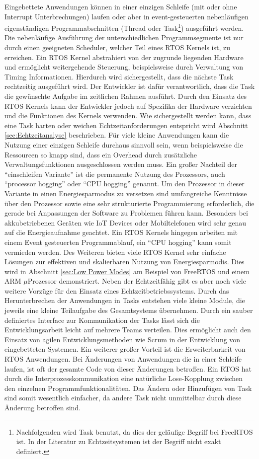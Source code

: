 Eingebettete Anwendungen können in einer einzigen Schleife (mit oder ohne Interrupt Unterbrechungen) laufen oder aber in event-gesteuerten ne\-ben\-läuf\-igen ei\-gen\-stän\-dig\-en Programmabschnitten (Thre\-ad oder Task\footnote{Nachfolgenden wird Task benutzt, da dies der geläufige Begriff bei FreeRTOS ist. In der Literatur zu Echtzeitsystemen ist der Begriff nicht exakt definiert.}) ausgeführt werden. Die nebenläufige Aus\-füh\-rung der unterschiedlichen Programmsegmente ist nur durch einen geeigneten Scheduler, welcher Teil eines RTOS Kernels ist, zu erreichen. Ein RTOS Kernel abstrahiert von der zugrunde liegenden Hardware und ermöglicht weitergehende Steuerung, beispielsweise durch Verwaltung von Timing Informationen. Hierdurch wird sichergestellt, dass die nächste Task rechtzeitig ausgeführt wird. Der Entwickler ist dafür verantwortlich, dass die Task die gewünschte Aufgabe im zeitlichen Rahmen ausführt. Durch den Einsatz des RTOS Kernels kann der Entwickler jedoch auf Spezifika der Hardware verzichten und die Funktionen des Kernels verwenden. Wie sichergestellt werden kann, dass eine Task  harten oder weichen Echtzeitanforderungen entspricht wird Abschnitt \ref{sec:Echtzeitanalyse} beschrieben. Für viele kleine Anwendungen kann die Nutzung einer einzigen Schleife durchaus sinnvoll sein, wenn beispielsweise die Ressourcen so knapp sind, dass ein Overhead durch zusätzliche Verwaltungsfunktionen ausgeschlossen werden muss. Ein großer Nachteil der "`einschleifen Variante"' ist die permanente Nutzung des Prozessors, auch "`processor hogging"' oder "`CPU hogging"' genannt. Um den Prozessor in dieser Variante in einen Energiesparmodus zu versetzen sind umfangreiche Kenntnisse über den Prozessor sowie eine sehr strukturierte Programmierung erforderlich, die gerade bei Anpassungen der Software zu Problemen führen kann. Besonders bei akkubetriebenen Geräten wie IoT Devices oder Mobiltelefonen wird sehr genau auf die Energieaufnahme geachtet. Ein RTOS Kernels hingegen arbeiten mit einem Event gesteuerten Programmablauf, ein "`CPU hogging"' kann somit vermieden werden. Des Weiteren bieten viele RTOS Kernel sehr einfache Lösungen zur effektiven und skalierbaren Nutzung von Energiesparmodis. Dies wird in Abschnitt \ref{sec:Low Power Modes} am Beispiel von FreeRTOS und einem ARM $\mu$Prozessor demonstriert. Neben der Echtzeitfähig gibt es aber noch viele weitere Vorzüge für den Einsatz eines Echtzeitbetriebssystems.  
Durch das Herunterbrechen der Anwendungen in Tasks entstehen viele kleine Module, die jeweils eine kleine Teilaufgabe des Gesamtsystems übernehmen. Durch ein sauber definiertes Interface zur Kommunikation der Tasks lässt sich die Entwicklungsarbeit leicht auf mehrere Teams verteilen. Dies ermöglicht auch den Einsatz von agilen Entwicklungsmethoden wie Scrum in der Entwicklung von eingebetteten Systemen. Ein weiterer großer Vorteil ist die Erweiterbarkeit von RTOS Anwendungen. Bei Änderungen von Anwendungen die in einer Schleife laufen, ist oft der gesamte Code von dieser Änderungen betroffen. Ein RTOS hat durch die Interprozesskommunikation eine natürliche Lose-Kopplung zwischen den einzelnen Programmfunktionalitäten. Das Ändern oder Hinzufügen von Task sind somit wesentlich einfacher, da andere Task nicht unmittelbar durch diese Änderung betroffen sind.    


